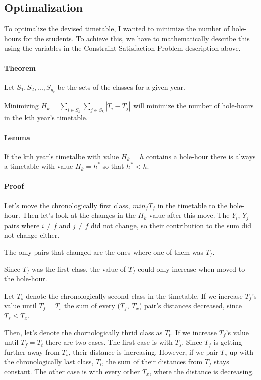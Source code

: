 \subsection{Optimalization}

To optimalize the devised timetable, I wanted to minimize the number of hole-hours for the students. To achieve this, we have to mathematically describe this using the variables in the Constraint Satisfaction Problem description above.

\paragraph{Theorem}

Let $S_1,S_2,...,S_{y_c}$ be the sets of the classes for a given year.

Minimizing $H_k = \sum\limits_{i\in{}S_k}\sum\limits_{j\in{}S_k}|T_i - T_j|$ will minimize the number of hole-hours in the kth year's timetable.

\paragraph{Lemma}

If the kth year's timetalbe with value $H_k = h$ contains a hole-hour there is always a timetable with value $H_k=h^*$ so that $h^* < h$.

\paragraph{Proof}

Let's move the chronologically first class, $min_{f}T_f$ in the timetable to the hole-hour. Then let's look at the changes in the $H_k$ value after this move. The $Y_i$, $Y_j$ pairs where $i\neq{}f$ and $j\neq{}f$ did not change, so their contribution to the sum did not change either.

The only pairs that changed are the ones where one of them was $T_f$.

Since $T_f$ was the first class, the value of $T_f$ could only increase when moved to the hole-hour.

Let $T_s$ denote the chronologically second class in the timetable. If we increase $T_f$'s value until $T_f = T_s$ the sum of every ($T_f$, $T_x$) pair's distances decreased, since $T_s\leq{}T_x$.

Then, let's denote the chornologically thrid class as $T_t$. If we increase  $T_f$'s value until $T_f = T_t$ there are two cases. The first case is with $T_s$. Since $T_f$ is getting further away from $T_s$, their distance is increasing. However, if we pair $T_s$ up with the chronologically last class, $T_l$, the sum of their distances from $T_f$ stays constant. The other case is with every other $T_x$, where the distance is decreasing.

